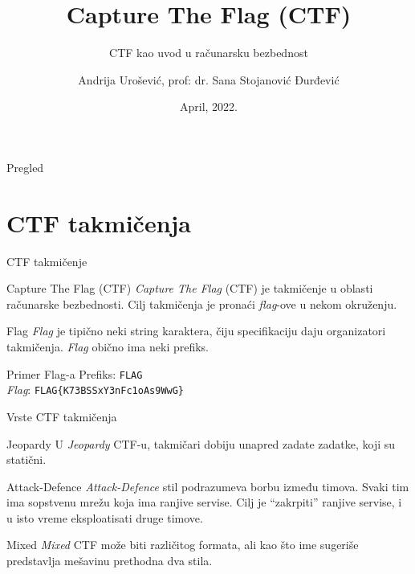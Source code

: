\documentclass[aspectratio=169,xcolor=dvipsnames]{beamer}
\title[short title]{Capture The Flag (CTF)}
\subtitle{CTF kao uvod u računarsku bezbednost}
\author[andrija] {Andrija Urošević, prof: dr. Sana Stojanović Đurđević}
\institute[matf]
{
    Računarstvo i društvo\\
    Univerzitet u Beogradu\\
    Matematički fakultet
}
\date{April, 2022.}
\begin{document}
\begin{frame}
    \titlepage
\end{frame}

\begin{frame}{Pregled}
    \tableofcontents
\end{frame}

\section{CTF takmičenja}

\begin{frame}{CTF takmičenje}

    \begin{block}{Capture The Flag (CTF)}
        \emph{Capture The Flag} (CTF) je takmičenje u oblasti računarske 
        bezbednosti. Cilj takmičenja je pronaći \emph{flag}-ove u nekom 
        okruženju.
    \end{block}

    \begin{block}{Flag}
        \emph{Flag} je tipično neki string karaktera, čiju specifikaciju daju
        organizatori takmičenja. \emph{Flag} obično ima neki prefiks.
    \end{block}

    \begin{exampleblock}{Primer Flag-a}
        Prefiks: \texttt{FLAG} \\
        \emph{Flag}: \texttt{FLAG\{K73BSSxY3nFc1oAs9WwG\}}
    \end{exampleblock}


\end{frame}


\begin{frame}{Vrste CTF takmičenja}

    \begin{block}{Jeopardy}
        U \emph{Jeopardy} CTF-u, takmičari dobiju unapred zadate zadatke, 
        koji su statični.
    \end{block}

    \begin{block}{Attack-Defence}
        \emph{Attack-Defence} stil podrazumeva borbu između timova. Svaki 
        tim ima sopstvenu mrežu koja ima ranjive servise. Cilj je ``zakrpiti'' 
        ranjive servise, i u isto vreme eksploatisati druge timove. 
    \end{block}

    \begin{block}{Mixed}
        \emph{Mixed} CTF može biti različitog formata, ali kao što ime sugeriše 
        predstavlja mešavinu prethodna dva stila.
    \end{block}
    
\end{frame}
\end{document}
